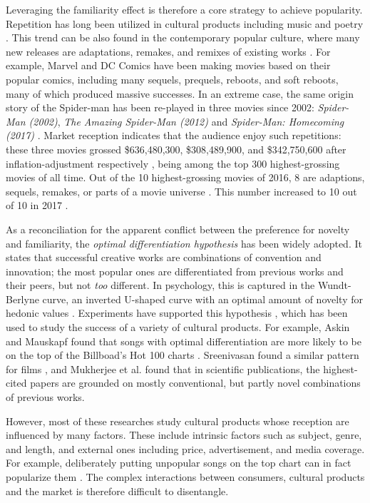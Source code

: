 \documentclass[letterpaper]{article} %
\begin{document}
Leveraging the familiarity effect is therefore a core strategy to achieve popularity. Repetition has long been utilized in cultural products including music and poetry \cite{huron2013psychological}. This trend can be also found in the contemporary popular culture, where many new releases are adaptations, remakes, and remixes of existing works \cite{manovich2007comes}. For example, Marvel and DC Comics have been making movies based on their popular comics, including many sequels, prequels, reboots, and soft reboots, many of which produced massive successes. In an extreme case, the same origin story of the Spider-man has been re-played in three movies since 2002: \emph{Spider-Man (2002)}, \emph{The Amazing Spider-Man (2012)} and \emph{Spider-Man: Homecoming (2017)} \cite{spiderman}. Market reception indicates that the audience enjoy such repetitions: these three movies grossed \$636,480,300, \$308,489,900, and \$342,750,600 after inflation-adjustment respectively \cite{spider-gross}, being among the top 300 highest-grossing movies of all time. Out of the 10 highest-grossing movies of 2016, 8 are adaptions, sequels, remakes, or parts of a movie universe \cite{2016film}. This number increased to 10 out of 10 in 2017 \cite{2017film}. 

As a reconciliation for the apparent conflict between the preference for novelty and familiarity, the \emph{optimal differentiation hypothesis} \cite{thompson2017hit} has been widely adopted. It states that successful creative works are combinations of convention and innovation; the most popular ones are differentiated from previous works and their peers, but not \emph{too} different. In psychology, this is captured in the Wundt-Berlyne curve, an inverted U-shaped curve with an optimal amount of novelty for hedonic values \cite{berlyne1970novelty}. Experiments have supported this hypothesis \cite{hargreaves1984effects} \cite{sluckin1980liking}, which has been used to study the success of a variety of cultural products. For example, Askin and Mauskapf found that songs with optimal differentiation are more likely to be on the top of the Billboad's Hot 100 charts \cite{askin2017makes}. Sreenivasan found a similar pattern for films \cite{sreenivasan2013quantitative}, and Mukherjee et al. found that in scientific publications, the highest-cited papers are grounded on mostly conventional, but partly novel combinations of previous works. 

However, most of these researches study cultural products whose reception are influenced by many factors. These include intrinsic factors such as subject, genre, and length, and external ones including price, advertisement, and media coverage. For example, deliberately putting unpopular songs on the top chart can in fact popularize them \cite{salganik2008leading}. The complex interactions between consumers, cultural products and the market is therefore difficult to disentangle. 
 
\end{document}
